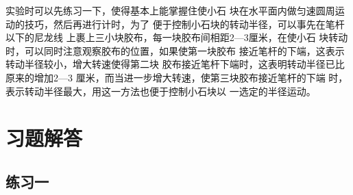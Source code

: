 实验时可以先练习一下，使得基本上能掌握住使小石
块在水平面内做匀速圆周运动的技巧，然后再进行计时，为了
便于控制小石块的转动半径，可以事先在笔杆以下的尼龙线
上裹上三小块胶布，每一块胶布间相距2—3厘米，在使小石
块转动时，可以同时注意观察胶布的位置，如果使第一块胶布
接近笔杆的下端，这表示转动半径较小，增大转速使得第二块
胶布接近笔杆下端时，这表明转动半径已比原来的增加2—3
厘米，而当进一步增大转速，使第三块胶布接近笔杆的下端
时，表示转动半径最大，用这一方法也便于控制小石块以
一选定的半径运动。

\section{习题解答}


\subsection{练习一}
